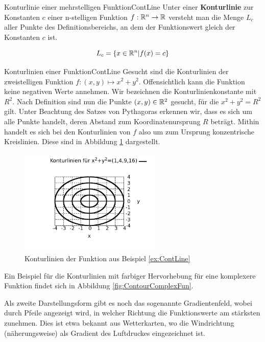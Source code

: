 \begin{definition}{Konturlinie einer mehrstelligen Funktion}{ContLine}
    Unter einer \textbf{Konturlinie} zur Konstanten $c$ einer n-stelligen Funktion $f: \mathbb{R}^n\to\mathbb{R}$ versteht man die Menge $L_c$ aller Punkte des Definitionsbereichs, an dem der Funktionswert gleich der Konstanten $c$ ist.

    $$
       L_c = \lbrace x \in \mathbb{R}^n | f(x) = c \rbrace
    $$
\end{definition}

\begin{example}{Konturlinien einer Funktion}{ContLine}
    Gesucht sind die Konturlinien der zweistelligen Funktion $f: (x,y) \mapsto x^2+y^2$. Offensichtlich kann die Funktion keine negativen Werte annehmen. Wir bezeichnen die Konturlinienkonstante mit $R^2$. Nach Definition sind nun die Punkte $(x,y)\in\mathbb{R}^2$ gesucht, für die $x^2+y^2=R^2$ gilt. Unter Beachtung des Satzes von Pythagoras erkennen wir, dass es sich um alle Punkte handelt, deren Abstand zum Koordinatenursprung $R$ beträgt. Mithin handelt es sich bei den Konturlinien von $f$ also um zum Ursprung konzentrische Kreislinien. Diese sind in Abbildung \ref{fig:ExContLine} dargestellt.
\end{example}

\begin{figure}
    \centering
    \includegraphics[width=0.6\textwidth]{./gnuplot/example-contour-plot}
    \caption{Konturlinien der Funktion aus Beispiel \ref{ex:ContLine}}
    \label{fig:ExContLine}
\end{figure}

Ein Beispiel für die Konturlinien mit farbiger Hervorhebung für eine komplexere Funktion findet sich in Abbildung \ref{fig:ContourComplexFun}.

Als zweite Darstellungsform gibt es noch das sogenannte Gradientenfeld, wobei durch Pfeile angezeigt wird, in welcher Richtung die Funktionswerte am stärksten zunehmen. Dies ist etwa bekannt aus Wetterkarten, wo die Windrichtung (näherungsweise) als Gradient des Luftdruckes eingezeichnet ist.

